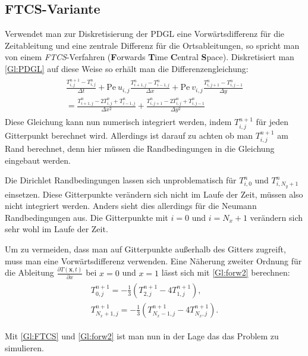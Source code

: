 \subsection{FTCS-Variante}
Verwendet man zur Diskretisierung der PDGL eine Vorwärtsdifferenz für die Zeitableitung und eine zentrale Differenz für die Ortsableitungen, so spricht man von einem \emph{FTCS}-Verfahren (\textbf{F}orwards \textbf{T}ime \textbf{C}entral \textbf{S}pace).
Diskretisiert man \cref{Gl:PDGL} auf diese Weise so erhält man die Differenzengleichung:
\begin{align}
  \begin{split}
  \frac{T^{n+1}_{i,j}-T^{n}_{i,j}}{\Delta t} + \text{Pe}~ u_{i,j} \frac{T^{n}_{i+1,j}-T^{n}_{i-1,j}}{\Delta x} + \text{Pe}~ v_{i,j} \frac{T^{n}_{i,j+1}-T^{n}_{i,j-1}}{\Delta y}\\
   =  \frac{T^{n}_{i+1,j}-2T^{n}_{i,j}+T^{n}_{i-1,j}}{\Delta x^2} +\frac{T^{n}_{i,j+1}-2T^{n}_{i,j}+T^{n}_{i,j-1}}{\Delta y^2}
 \end{split}\label{Gl:FTCS}
\end{align}
Diese Gleichung kann nun numerisch integriert werden, indem $T^{n+1}_{i,j}$ für jeden Gitterpunkt berechnet wird.
Allerdings ist darauf zu achten ob man $T^{n+1}_{i,j}$ am Rand berechnet, denn hier müssen die Randbedingungen in die Gleichung eingebaut werden.

Die Dirichlet Randbedingungen lassen sich unproblematisch für $T^{n}_{i,0}$ und $T^{n}_{i,N_y+1}$ einsetzen. Diese Gitterpunkte verändern sich nicht im Laufe der Zeit, müssen also nicht integriert werden.
Anders sieht dies allerdings für die Neumann Randbedingungen aus. Die Gitterpunkte mit $i=0$ und $i=N_x+1$ verändern sich sehr wohl im Laufe der Zeit.

Um zu vermeiden, dass man auf Gitterpunkte außerhalb des Gitters zugreift, muss man eine Vorwärtsdifferenz verwenden.
Eine Näherung zweiter Ordnung für die Ableitung $\frac{\partial T(\boldsymbol x,t)}{\partial x}$ bei $x=0$ und $x=1$ lässt sich mit \cref{Gl:forw2} berechnen:
\begin{align}
  \begin{split}
  T^{n+1}_{0,j} = -\frac{1}{3} \left( T^{n+1}_{2,j}-4T^{n+1}_{1,j}\right), \\
  T^{n+1}_{N_x+1,j} = -\frac{1}{3} \left( T^{n+1}_{N_x-1,j}-4T^{n+1}_{N_x,j}\right).
\end{split}\label{Gl:forw2}
\end{align}

Mit \cref{Gl:FTCS} und \cref{Gl:forw2} ist man nun in der Lage das das Problem zu simulieren.


